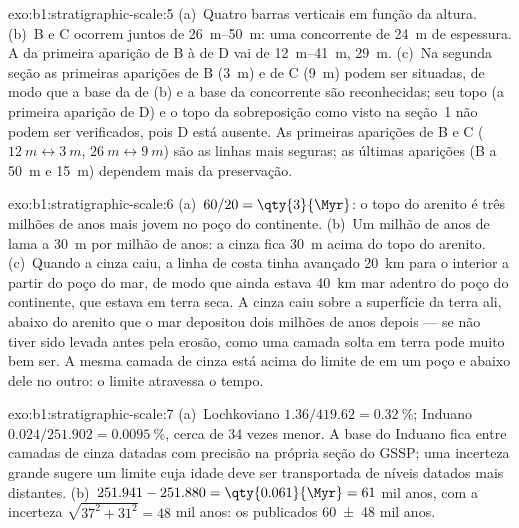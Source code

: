 \begin{solution}{exo:b1:stratigraphic-scale:5}
(a)~Quatro barras verticais em função da altura. (b)~B e C ocorrem juntos de
\qtyrange{26}{50}{m}: uma  concorrente de \qty{24}{m} de espessura. A  da primeira aparição de B à de D vai de \qtyrange{12}{41}{m}, \qty{29}{m}. (c)~Na
segunda seção as primeiras aparições de B (\qty{3}{m}) e de C (\qty{9}{m}) podem ser situadas,
de modo que a base da  de (b) e a base da  concorrente são
reconhecidas; seu topo (a primeira aparição de D) e o topo da sobreposição como visto na
seção~1 não podem ser verificados, pois D está ausente. As primeiras aparições de B e C
($\qty{12}{m} \leftrightarrow
\qty{3}{m}$, $\qty{26}{m} \leftrightarrow \qty{9}{m}$) são as linhas mais seguras; as últimas
aparições (B a \qty{50}{m} e \qty{15}{m}) dependem mais da preservação.
\end{solution}

\begin{solution}{exo:b1:stratigraphic-scale:6}
(a)~$60/20 = \qty{3}{\Myr}$: o topo do arenito é três milhões de anos mais jovem no poço do
continente. (b)~Um milhão de anos de lama a \qty{30}{m} por milhão de anos: a cinza fica
\qty{30}{m} acima do topo do arenito. (c)~Quando a cinza caiu, a linha de costa tinha
avançado \qty{20}{km} para o interior a partir do poço do mar, de modo que ainda estava
\qty{40}{km} mar adentro do poço do continente, que estava em terra seca. A cinza caiu sobre a
superfície da terra ali, abaixo do arenito que o mar depositou dois milhões de anos depois ---
se não tiver sido levada antes pela erosão, como uma camada solta em terra pode muito bem ser.
A mesma camada de cinza está acima do limite de  em um poço e abaixo dele no outro: o
limite atravessa o tempo.
\end{solution}

\begin{solution}{exo:b1:stratigraphic-scale:7}
(a)~Lochkoviano $1.36/419.62 = \qty{0.32}{\%}$; Induano $0.024/251.902 =
\qty{0.0095}{\%}$, cerca de 34 vezes menor. A base do Induano fica entre camadas de cinza
datadas com precisão na própria seção do GSSP; uma incerteza grande sugere um limite cuja idade
deve ser transportada de níveis datados mais distantes. (b)~$251.941 - 251.880 = \qty{0.061}{\Myr} = 61$ mil anos, com a incerteza $\sqrt{37^2 + 31^2} = 48$ mil anos: os publicados
\num[uncertainty-mode=separate]{60 \pm 48} mil anos.
\end{solution}

